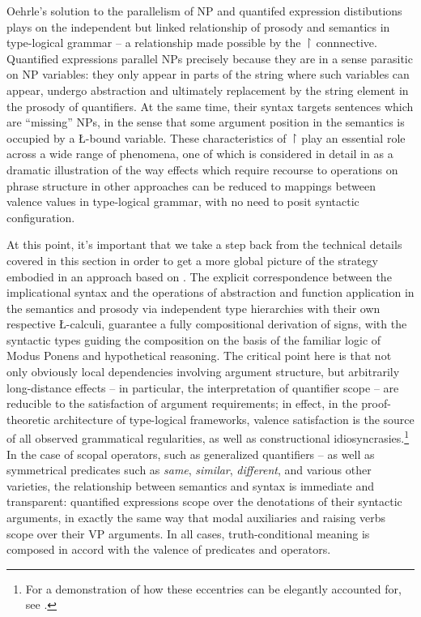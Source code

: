 \documentclass[output=paper,colorlinks,citecolor=brown]{langscibook}
\begin{document}
Oehrle's solution to the parallelism of NP and quantifed expression
distibutions plays on the independent but linked relationship of
prosody and semantics in type-logical grammar -- a relationship made
possible by the \ensuremath{\vs} connnective. Quantified expressions parallel NPs
precisely because they are in a sense parasitic on NP variables: they
only appear in parts of the string where such variables can appear,
undergo abstraction and ultimately replacement by the string element
in the prosody of quantifiers. At the same time, their syntax targets
sentences which are ``missing'' NPs, in the sense that some argument
position in the semantics is occupied by a \L-bound variable. These
characteristics of \ensuremath{\vs} play an essential role across a wide range of
phenomena, one of which is considered in detail in  as
a dramatic illustration of the way effects which require recourse to
operations on phrase structure in other approaches can be reduced to
mappings between valence values in type-logical grammar, with no need
to posit syntactic configuration.



At this point, it's important that we take a step back from the
technical details covered in this section in order to get a more
global picture of the strategy embodied in an approach based on
. The explicit correspondence between the implicational syntax
and the operations of abstraction and function application in the
semantics and prosody via independent type hierarchies with their own
respective \L-calculi, guarantee a fully compositional derivation of
signs, with the syntactic types guiding the composition on the basis
of the familiar logic of Modus Ponens and hypothetical reasoning. The
critical point here is that not only obviously local dependencies
involving argument structure, but arbitrarily long-distance
effects -- in particular, the interpretation of quantifier scope -- are
reducible to the satisfaction of argument requirements; in effect, in
the proof-theoretic architecture of type-logical frameworks, valence
satisfaction is the source of all observed grammatical regularities,
as well as constructional idiosyncrasies.\footnote{For
a demonstration of how these eccentries can be elegantly accounted
for, see \citet{kubota-levine2022a}.} In the case of scopal operators, such
as generalized quantifiers -- as well as symmetrical predicates such as
\textit{same}, \textit{similar}, \textit{different}, and various other varieties, the
relationship between semantics and syntax is immediate and
transparent: quantified expressions scope over the denotations of
their syntactic arguments, in exactly the same way that modal
auxiliaries and raising verbs scope over their VP arguments. In all
cases, truth-conditional meaning is composed in accord with the
valence of predicates and operators.
\end{document}
